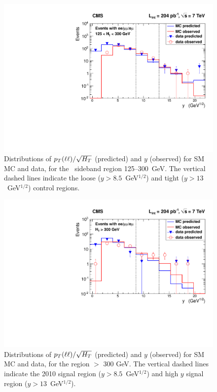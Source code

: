 \begin{figure}[tbh]
\begin{center}
\includegraphics[width=0.6\linewidth]{plots/victory_204pb_control.pdf}
\caption{\label{fig:vic1}\protect Distributions of $p_T(\ell\ell)/\sqrt{H_T}$ (predicted) and $y$ (observed) for 
SM MC and data, for the \Ht\ sideband region 125--300~GeV. 
The vertical dashed lines indicate the loose ($y > 8.5$~GeV$^{1/2}$) and tight ($y > 13$~GeV$^{1/2}$) control regions.
}
\end{center}
\end{figure}

\begin{figure}[tbh]
\begin{center}
\includegraphics[width=0.6\linewidth]{plots/victory_204pb_ht300.pdf}
\caption{\label{fig:v2}\protect Distributions of $p_T(\ell\ell)/\sqrt{H_T}$ (predicted) and $y$ (observed) for 
SM MC and data, for the region \Ht $>$ 300 GeV. 
The vertical dashed lines indicate the 2010 signal region ($y > 8.5$~GeV$^{1/2}$) and high $y$ signal region ($y > 13$~GeV$^{1/2}$).
}
\end{center}
\end{figure}

